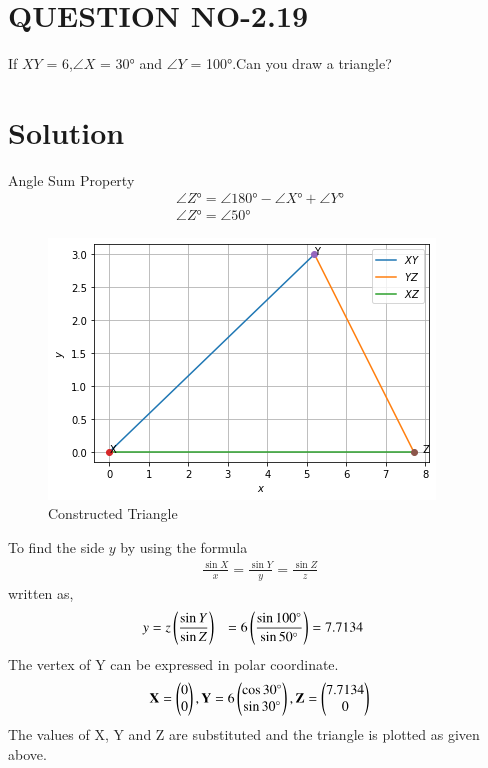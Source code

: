 \documentclass[journal,12pt,twocolumn]{IEEEtran}
\begin{document}
\section{QUESTION NO-2.19}
 \noindent If  $XY$ = 6,$\angle{X}$ = \ang{30} and $\angle{Y}$ = \ang{100}.Can you draw a triangle?
%
\section{Solution}
%
Angle  Sum  Property
%
\begin{align}
             \angle Z\si{\degree} = \angle 180\si{\degree} - \angle X\si{\degree} + \angle Y\si{\degree}\\
             \angle Z\si{\degree} = \angle 50\si{\degree}
\end{align}
%
\begin{figure}[!b]
 \centering
           \includegraphics[width=\columnwidth]{Figure_1.png}
           \caption{Constructed Triangle}
           \label{Figure}
\end{figure}
%
To find the side $y$ by using the formula
%
\begin{align}
\frac{\sin{X}}{x} = \frac{\sin{Y}}{y} = \frac{\sin{Z}}{z}
\end{align}
%
written as,
%
\begin{align}
y&= z\left(\frac{\sin{Y}}{\sin{Z}}\right) 
&= 6 \left(\frac{\sin{\ang{100}}}{\sin{\ang{50}}}\right)
&= 7.7134
\end{align}
The vertex of Y can be expressed in polar coordinate.
\begin{align}
\mathbf{X} =\begin{pmatrix}0 \\ 0\end{pmatrix},
\mathbf{Y} =6\begin{pmatrix}\cos{\ang{30}} \\ \sin{\ang{30}}\end{pmatrix},
\mathbf{Z} =\begin{pmatrix}7.7134 \\ 0\end{pmatrix}
\end{align}
The values of X, Y and Z are substituted and the triangle is plotted as given above.
\end{document}
